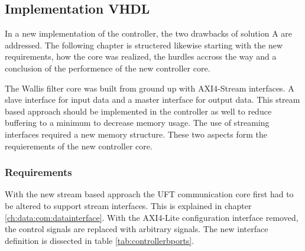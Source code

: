 
\subsection{Implementation VHDL} \label{ch:controller:vhdl}
In a new implementation of the controller, the two drawbacks of solution A are
addressed. The following chapter is structered likewise starting with the new
requirements, how the core was realized, the hurdles accross the way and a
conclusion of the performence of the new controller core.

The Wallis filter core was built from ground up with AXI4-Stream interfaces. A
slave interface for input data and a master interface for output data. This
stream based approach should be implemented in the controller as well to reduce
buffering to a minimum to decrease memory usage. The use of streaming interfaces
required a new memory structure. These two aspects form the requierements of the
new controller core.

\subsubsection*{Requirements}
With the new stream based approach the UFT communication core first had to be
altered to support stream interfaces. This is explained in chapter 
\ref{ch:data:com:datainterface}. With the AXI4-Lite configuration interface
removed, the
control signals are replaced with arbitrary signals. The new interface
definition is dissected in table \ref{tab:controllerbports}.

